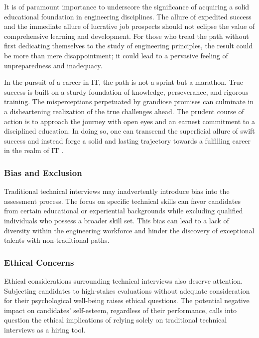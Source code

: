 \documentclass[
    a4paper, %
    10pt, %
    unnumberedsections, %
    twoside, %
]{LTJournalArticle}
\begin{document}
It is of paramount importance to underscore the significance of acquiring a solid educational foundation in engineering disciplines. The allure of expedited success and the immediate allure of lucrative job prospects should not eclipse the value of comprehensive learning and development. For those who tread the path without first dedicating themselves to the study of engineering principles, the result could be more than mere disappointment; it could lead to a pervasive feeling of unpreparedness and inadequacy.

In the pursuit of a career in IT, the path is not a sprint but a marathon. True success is built on a sturdy foundation of knowledge, perseverance, and rigorous training. The misperceptions perpetuated by grandiose promises can culminate in a disheartening realization of the true challenges ahead. The prudent course of action is to approach the journey with open eyes and an earnest commitment to a disciplined education. In doing so, one can transcend the superficial allure of swift success and instead forge a solid and lasting trajectory towards a fulfilling career in the realm of IT \cite{tetlock2007illusion}.











\subsubsection*{Bias and Exclusion}

Traditional technical interviews may inadvertently introduce bias into the assessment process. The focus on specific technical skills can favor candidates from certain educational or experiential backgrounds while excluding qualified individuals who possess a broader skill set. This bias can lead to a lack of diversity within the engineering workforce and hinder the discovery of exceptional talents with non-traditional paths.

\subsubsection*{Ethical Concerns}

Ethical considerations surrounding technical interviews also deserve attention. Subjecting candidates to high-stakes evaluations without adequate consideration for their psychological well-being raises ethical questions. The potential negative impact on candidates' self-esteem, regardless of their performance, calls into question the ethical implications of relying solely on traditional technical interviews as a hiring tool.
\end{document}
